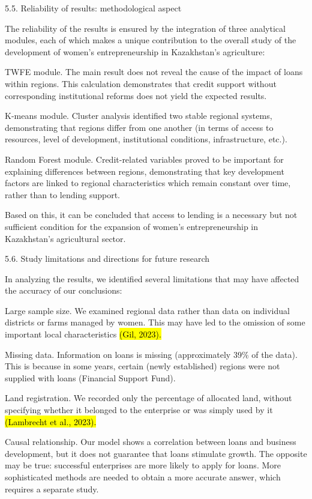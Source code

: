 \documentclass[
]{article}
\begin{document}
5.5. Reliability of results: methodological aspect

The reliability of the results is ensured by the integration of three
analytical modules, each of which makes a unique contribution to the
overall study of the development of women's entrepreneurship in
Kazakhstan's agriculture:

TWFE module. The main result does not reveal the cause of the impact of
loans within regions. This calculation demonstrates that credit support
without corresponding institutional reforms does not yield the expected
results.

K-means module. Cluster analysis identified two stable regional systems,
demonstrating that regions differ from one another (in terms of access
to resources, level of development, institutional conditions,
infrastructure, etc.).

Random Forest module. Credit-related variables proved to be important
for explaining differences between regions, demonstrating that key
development factors are linked to regional characteristics which remain
constant over time, rather than to lending support.

Based on this, it can be concluded that access to lending is a necessary
but not sufficient condition for the expansion of women's
entrepreneurship in Kazakhstan's agricultural sector.

5.6. Study limitations and directions for future research

In analyzing the results, we identified several limitations that may
have affected the accuracy of our conclusions:

Large sample size. We examined regional data rather than data on
individual districts or farms managed by women. This may have led to the
omission of some important local characteristics \hl{(Gil, 2023).}

Missing data. Information on loans is missing (approximately 39\% of the
data). This is because in some years, certain (newly established)
regions were not supplied with loans (Financial Support Fund).

Land registration. We recorded only the percentage of allocated land,
without specifying whether it belonged to the enterprise or was simply
used by it \hl{(Lambrecht et al., 2023).}

Causal relationship. Our model shows a correlation between loans and
business development, but it does not guarantee that loans stimulate
growth. The opposite may be true: successful enterprises are more likely
to apply for loans. More sophisticated methods are needed to obtain a
more accurate answer, which requires a separate study.
\end{document}
